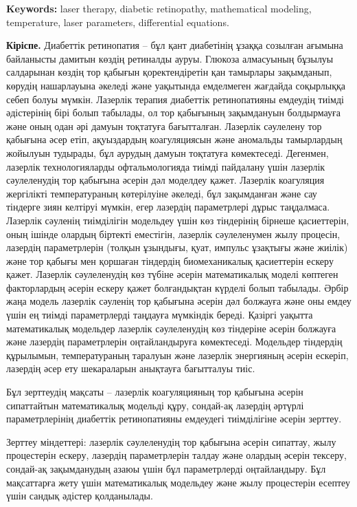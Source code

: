 {\bfseries Keywords:} laser therapy, diabetic retinopathy, mathematical
modeling, temperature, laser parameters, differential equations.

\begin{multicols}{2}
{\bfseries Кіріспе.} Диабеттік ретинопатия -- бұл қант диабетінің ұзаққа
созылған ағымына байланысты дамитын көздің ретиналды ауруы. Глюкоза
алмасуының бұзылуы салдарынан көздің тор қабығын қоректендіретін қан
тамырлары зақымданып, көрудің нашарлауына әкеледі және уақытында
емделмеген жағдайда соқырлыққа себеп болуы мүмкін. Лазерлік терапия
диабеттік ретинопатияны емдеудің тиімді әдістерінің бірі болып табылады,
ол тор қабығының зақымдануын болдырмауға және оның одан әрі дамуын
тоқтатуға бағытталған. Лазерлік сәулелену тор қабығына әсер етіп,
ақуыздардың коагуляциясын және аномальды тамырлардың жойылуын тудырады,
бұл аурудың дамуын тоқтатуға көмектеседі. Дегенмен, лазерлік
технологияларды офтальмологияда тиімді пайдалану үшін лазерлік
сәулеленудің тор қабығына әсерін дәл моделдеу қажет. Лазерлік коагуляция
жергілікті температураның көтерілуіне әкеледі, бұл зақымданған және сау
тіндерге зиян келтіруі мүмкін, егер лазердің параметрлері дұрыс
таңдалмаса. Лазерлік сәуленің тиімділігін модельдеу үшін көз тіндерінің
бірнеше қасиеттерін, оның ішінде олардың біртекті еместігін, лазерлік
сәулеленумен жылу процесін, лазердің параметрлерін (толқын ұзындығы,
қуат, импульс ұзақтығы және жиілік) және тор қабығы мен қоршаған
тіндердің биомеханикалық қасиеттерін ескеру қажет. Лазерлік сәулеленудің
көз түбіне әсерін математикалық моделі көптеген факторлардың әсерін
ескеру қажет болғандықтан күрделі болып табылады. Әрбір жаңа модель
лазерлік сәуленің тор қабығына әсерін дәл болжауға және оны емдеу үшін
ең тиімді параметрлерді таңдауға мүмкіндік береді. Қазіргі уақытта
математикалық модельдер лазерлік сәулеленудің көз тіндеріне әсерін
болжауға және лазердің параметрлерін оңтайландыруға көмектеседі.
Модельдер тіндердің құрылымын, температураның таралуын және лазерлік
энергияның әсерін ескеріп, лазердің әсер ету шекараларын анықтауға
бағытталуы тиіс.

Бұл зерттеудің мақсаты -- лазерлік коагуляцияның тор қабығына әсерін
сипаттайтын математикалық модельді құру, сондай-ақ лазердің әртүрлі
параметрлерінің диабеттік ретинопатияны емдеудегі тиімділігіне әсерін
зерттеу.

Зерттеу міндеттері: лазерлік сәулеленудің тор қабығына әсерін сипаттау,
жылу процестерін ескеру, лазердің параметрлерін талдау және олардың
әсерін тексеру, сондай-ақ зақымданудың азаюы үшін бұл параметрлерді
оңтайландыру. Бұл мақсаттарға жету үшін математикалық модельдеу және
жылу процестерін есептеу үшін сандық әдістер қолданылады.


\end{multicols}

